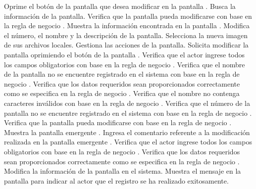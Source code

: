  \begin{UCtrayectoria}
	\UCpaso[\UCactor] Oprime el botón \btnEditar de la pantalla que desea modificar en la pantalla .
	\UCpaso[\UCsist] Busca la información de la pantalla.
	\UCpaso[\UCsist] Verifica que la pantalla pueda modificarse con base en la regla de negocio . 
    \UCpaso[\UCsist] Muestra la información encontrada en la pantalla .
    \UCpaso[\UCactor] Modifica el número, el nombre y la descripción de la pantalla. \label{cu6.2:ingresaDatos}
    \UCpaso[\UCactor] Selecciona la nueva imagen de sus archivos locales.\label{cu6.2:seleccionaImagen}
    \UCpaso[\UCactor] Gestiona las acciones de la pantalla.\label{cu6.2:gestionaAcciones}
    \UCpaso[\UCactor] Solicita modificar la pantalla oprimiendo el botón  de la pantalla .  
    \UCpaso[\UCsist] Verifica que el actor ingrese todos los campos obligatorios con base en la regla de negocio  . 
    \UCpaso[\UCsist] Verifica que el nombre de la pantalla no se encuentre registrado en el sistema con base en la regla de negocio  . 
    \UCpaso[\UCsist] Verifica que los datos requeridos sean proporcionados correctamente como se especifica en la regla de negocio .    
    \UCpaso[\UCsist] Verifica que el nombre no contenga caracteres inválidos con base en la regla de negocio . 
    \UCpaso[\UCsist] Verifica que el número de la pantalla no se encuentre registrado en el sistema con base en la regla de negocio  .     
	\UCpaso[\UCsist] Verifica que la pantalla pueda modificarse con base en la regla de negocio . 
	\UCpaso[\UCsist] Muestra la pantalla emergente .
	\UCpaso[\UCactor] Ingresa el comentario referente a la modificación realizada en la pantalla emergente . \label{cu6.2:ingresaComentario}
    \UCpaso[\UCsist] Verifica que el actor ingrese todos los campos obligatorios con base en la regla de negocio  . 
    \UCpaso[\UCsist] Verifica que los datos requeridos sean proporcionados correctamente como se especifica en la regla de negocio . 
    \UCpaso[\UCsist] Modifica la información de la pantalla en el sistema.
    \UCpaso[\UCsist] Muestra el mensaje  en la pantalla 
    para indicar al actor que el registro se ha realizado exitosamente.
 \end{UCtrayectoria}
 
